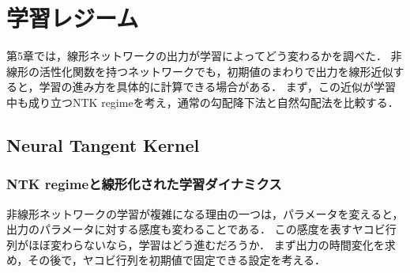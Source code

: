 \documentclass[../main.tex]{subfiles}
\begin{document}
\ifSubfilesClassLoaded{\setcounter{chapter}{5}}{}

\chapter{学習レジーム}

第5章では，線形ネットワークの出力が学習によってどう変わるかを調べた．
非線形の活性化関数を持つネットワークでも，初期値のまわりで出力を線形近似すると，学習の進み方を具体的に計算できる場合がある．
まず，この近似が学習中も成り立つNTK regime\cite{jacot2018ntk,lee2019wide}を考え，通常の勾配降下法と自然勾配法を比較する．

\section{Neural Tangent Kernel}
\label{sec:ntk}

\subsection{NTK regimeと線形化された学習ダイナミクス}

非線形ネットワークの学習が複雑になる理由の一つは，パラメータを変えると，出力のパラメータに対する感度も変わることである．
この感度を表すヤコビ行列がほぼ変わらないなら，学習はどう進むだろうか．
まず出力の時間変化を求め，その後で，ヤコビ行列を初期値で固定できる設定を考える．
\end{document}

